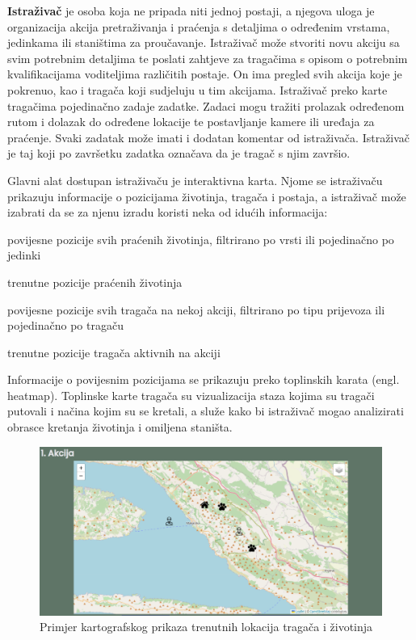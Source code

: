 		\textbf{Istraživač} je osoba koja ne pripada niti jednoj postaji, a njegova uloga je organizacija akcija pretraživanja i praćenja s detaljima o određenim vrstama, jedinkama ili staništima za proučavanje. Istraživač može stvoriti novu akciju sa svim potrebnim detaljima te poslati zahtjeve za tragačima  s opisom o potrebnim kvalifikacijama voditeljima različitih postaje. On ima pregled svih akcija koje je pokrenuo, kao i tragača koji sudjeluju u tim akcijama. Istraživač preko karte tragačima pojedinačno zadaje zadatke. Zadaci mogu tražiti prolazak određenom rutom i dolazak do određene lokacije te postavljanje kamere ili uređaja za praćenje. Svaki zadatak može imati i dodatan komentar od istraživača. Istraživač je taj koji po završetku zadatka označava da je tragač s njim završio.
		
		Glavni alat dostupan istraživaču je interaktivna karta. Njome se istraživaču prikazuju informacije o pozicijama životinja, tragača i postaja, a istraživač može izabrati da se za njenu izradu koristi neka od idućih informacija: 
		
		\begin{packed_item}
			\item povijesne pozicije svih praćenih životinja, filtrirano po vrsti ili pojedinačno po jedinki 
			\item trenutne pozicije praćenih životinja
			\item povijesne pozicije svih tragača na nekoj akciji, filtrirano po tipu prijevoza ili pojedinačno po tragaču 
			\item trenutne pozicije tragača aktivnih na akciji
		\end{packed_item}
		
		Informacije o povijesnim pozicijama se prikazuju preko toplinskih karata (engl. heatmap). Toplinske karte tragača su vizualizacija staza kojima su tragači putovali i načina kojim su se kretali, a služe kako bi istraživač mogao analizirati obrasce kretanja životinja i omiljena staništa.
		
		\begin{figure}[H]
			\includegraphics[scale=0.7]{slike/map_tracking.PNG} %
			\centering
			\caption{Primjer kartografskog prikaza trenutnih lokacija tragača i životinja}
			\label{fig:promjene}
		\end{figure}
		
